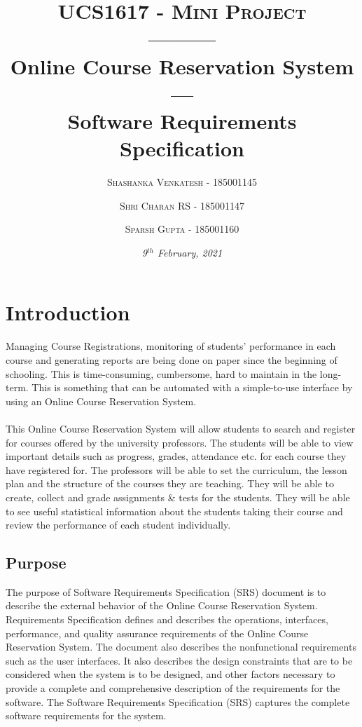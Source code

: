 \documentclass[12pt, a4]{article}
\title{{\large \textsc{UCS1617 - Mini Project}}\\---------\\\textbf{\huge{Online Course Reservation System}}\\---\\\textbf{Software Requirements Specification}}
\author {
  \textsc{Shashanka Venkatesh - 185001145}
  \and
  \textsc{Shri Charan RS - 185001147}
  \and
  \textsc{Sparsh Gupta - 185001160}
}
\date{\normalsize{\textsl{9$^{th}$ February, 2021}}}
\begin{document}
\maketitle
\newpage
\tableofcontents


\newpage
\section{Introduction}
Managing Course Registrations, monitoring of students' performance in each course and generating reports are being done on paper since the beginning of schooling. This is time-consuming, cumbersome, hard to maintain in the long-term. This is something that can be automated with a simple-to-use interface by using an Online Course Reservation System.
\\\\
This Online Course Reservation System will allow students to search and register for courses offered by the university professors. The students will be able to view important details such as progress, grades, attendance etc. for each course they have registered for.
The professors will be able to set the curriculum, the lesson plan and the structure of the courses they are teaching. They will be able to create, collect and grade assignments \& tests for the students. They will be able to see useful statistical information about the students taking their course and review the performance of each student individually.


\subsection{Purpose}
The purpose of Software Requirements Specification (SRS) document is to describe the external behavior of the Online Course Reservation System. Requirements Specification defines and describes the operations, interfaces, performance, and quality assurance requirements of the Online Course Reservation System. The document also describes the nonfunctional requirements such as the user interfaces.
It also describes the design constraints that are to be considered when the system is to be designed, and other factors necessary to
provide a complete and comprehensive description of the requirements for the software. The Software Requirements Specification (SRS) captures the complete software requirements for the system.
\end{document}
